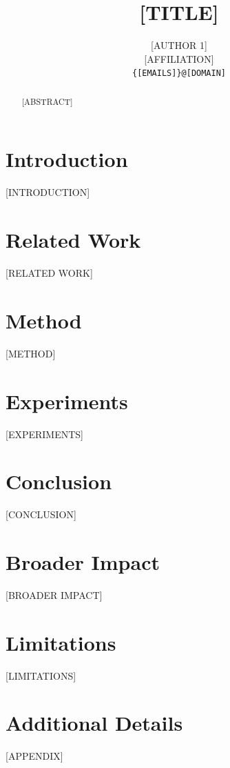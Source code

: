 \documentclass[10pt,twocolumn,letterpaper]{article}
\title{[TITLE]}
\author{[AUTHOR 1] \quad [AUTHOR 2] \quad [AUTHOR 3] \\[1ex]
  [AFFILIATION] \\
  \texttt{\{[EMAILS]\}@[DOMAIN]}
}
\theoremstyle{plain}
\theoremstyle{definition}
\theoremstyle{remark}
\begin{document}
\maketitle

\begin{abstract}
[ABSTRACT]
\end{abstract}

\section{Introduction}
\label{sec:intro}
[INTRODUCTION]

\section{Related Work}
\label{sec:related}
[RELATED WORK]

\section{Method}
\label{sec:method}
[METHOD]

\section{Experiments}
\label{sec:experiments}
[EXPERIMENTS]

\section{Conclusion}
\label{sec:conclusion}
[CONCLUSION]

\section*{Broader Impact}
[BROADER IMPACT]

\section*{Limitations}
[LIMITATIONS]




\appendix
\section{Additional Details}
[APPENDIX]
\end{document}
